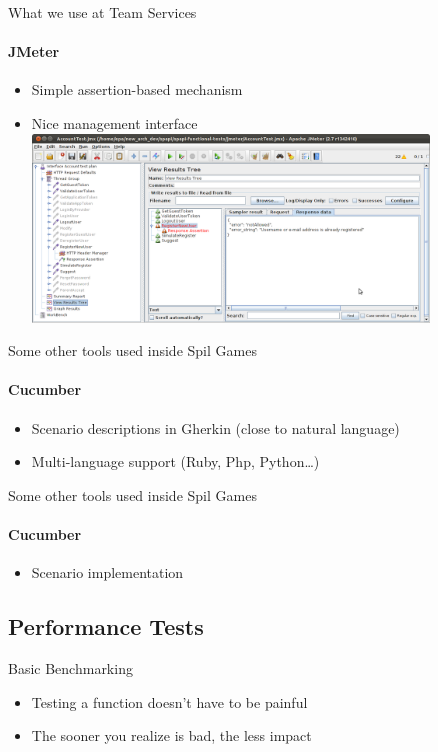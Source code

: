 \documentclass[aspectratio=169]{beamer}
\begin{document}
\begin{frame}{What we use at Team Services}
    \framesubtitle{JMeter}
    \begin{itemize}
    \item Simple assertion-based mechanism
    \item Nice management interface
    \includegraphics[height=5.0cm]{images/jmeter.png}
    \end{itemize}
\end{frame}

\begin{frame}{Some other tools used inside Spil Games}
    \framesubtitle{Cucumber}
    \begin{itemize}
    \item Scenario descriptions in Gherkin (close to natural language)
    \item Multi-language support (Ruby, Php, Python\dots)
        
    \end{itemize}
\end{frame}

\begin{frame}{Some other tools used inside Spil Games}
    \framesubtitle{Cucumber}
    \begin{itemize}
    \item Scenario implementation
        
    \end{itemize}
\end{frame}

\subsection*{Performance Tests}
\label{performance_tests}

\begin{frame}{Basic Benchmarking}
    \begin{itemize}
    \item Testing a function doesn't have to be painful
    \item The sooner you realize is bad, the less impact
    \pause
        
    \end{itemize}
\end{frame}
\end{document}
